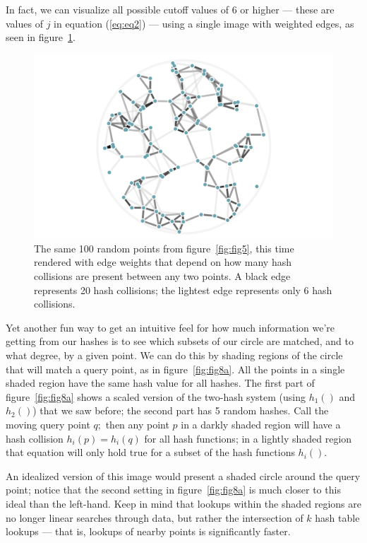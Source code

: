 \documentclass[20pt,]{extarticle}
\begin{document}
In fact, we can visualize all possible cutoff values of 6 or higher ---
these are values of \(j\) in equation (\ref{eq:eq2}) --- using a single
image with weighted edges, as seen in figure~\ref{fig:fig6}.

\begin{figure}
\centering
\includegraphics{images/lsh_image6.png}
\caption{The same 100 random points from figure~\ref{fig:fig5}, this
time rendered with edge weights that depend on how many hash collisions
are present between any two points. A black edge represents 20 hash
collisions; the lightest edge represents only 6 hash
collisions.}\label{fig:fig6}
\end{figure}

Yet another fun way to get an intuitive feel for how much information
we're getting from our hashes is to see which subsets of our circle are
matched, and to what degree, by a given point. We can do this by shading
regions of the circle that will match a query point, as in
figure~\ref{fig:fig8a}. All the points in a single shaded region have
the same hash value for all hashes. The first part of
figure~\ref{fig:fig8a} shows a scaled version of the two-hash system
(using \(h_1()\) and \(h_2()\)) that we saw before; the second part has
5 random hashes. Call the moving query point \(q;\) then any point \(p\)
in a darkly shaded region will have a hash collision \(h_i(p) = h_i(q)\)
for all hash functions; in a lightly shaded region that equation will
only hold true for a subset of the hash functions \(h_i().\)

An idealized version of this image would present a shaded circle around
the query point; notice that the second setting in
figure~\ref{fig:fig8a} is much closer to this ideal than the left-hand.
Keep in mind that lookups within the shaded regions are no longer linear
searches through data, but rather the intersection of \(k\) hash table
lookups --- that is, lookups of nearby points is significantly faster.
\end{document}
